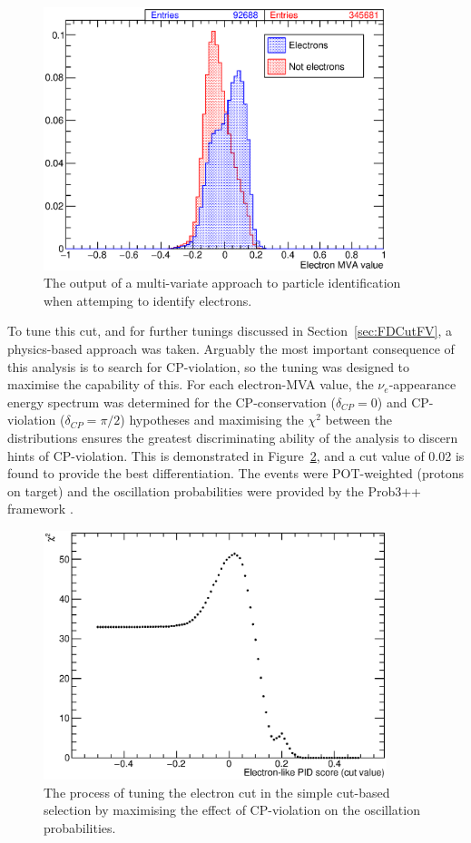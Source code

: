 \begin{figure}
  \centering
  \includegraphics[width=10cm]{ElectronMVA.eps}
  \caption[The output of a multi-variate approach to particle identification when attemping to identify electrons.]{The output of a multi-variate approach to particle identification when attemping to identify electrons.}
  \label{fig:ElectronMVA}
\end{figure}

To tune this cut, and for further tunings discussed in Section~\ref{sec:FDCutFV}, a physics-based approach was taken.  Arguably the most important consequence of this analysis is to search for CP-violation, so the tuning was designed to maximise the capability of this.  For each electron-MVA value, the $\nu_e$-appearance energy spectrum was determined for the CP-conservation ($\delta_{CP}=0$) and CP-violation ($\delta_{CP}=\pi/2$) hypotheses and maximising the $\chi^2$ between the distributions ensures the greatest discriminating ability of the analysis to discern hints of CP-violation.  This is demonstrated in Figure~\ref{fig:ElectronMVATune}, and a cut value of 0.02 is found to provide the best differentiation.  The events were POT-weighted (protons on target) and the oscillation probabilities were provided by the Prob3++ framework \cite{Prob3++}.

\begin{figure}
  \centering
  \includegraphics[width=10cm]{ElectronMVATune.eps}
  \caption[The process of tuning the electron cut in the simple cut-based selection by maximising the effect of CP-violation on the oscillation probabilities.]{The process of tuning the electron cut in the simple cut-based selection by maximising the effect of CP-violation on the oscillation probabilities.}
  \label{fig:ElectronMVATune}
\end{figure}

